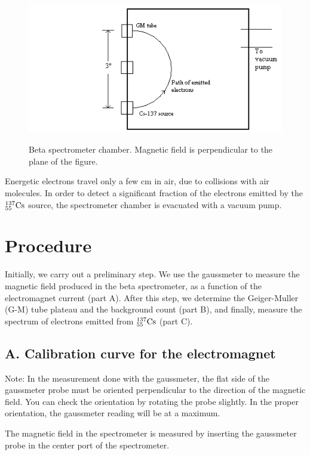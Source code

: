 \documentclass{article}
\newcommand{\cs}{${}^{137}_{55}{\rm Cs}$ }
\begin{document}
\begin{figure}
\begin{centering}
\includegraphics[width=4.9992in,height=2.528in]{images/beta-img5.png} 
\caption{Beta spectrometer chamber.  Magnetic field is perpendicular to the plane of the figure.}
\label{fig:chamber}
\end{centering}
\end{figure}

Energetic electrons travel only a few cm in air, due to collisions with
air molecules.  In order to detect a significant fraction of the
electrons emitted by the \cs source, the spectrometer chamber is
evacuated with a vacuum pump.

\section{Procedure}

Initially, we carry out a preliminary step.  We use the gaussmeter
to measure the magnetic field produced in the beta spectrometer, as a
function of the electromagnet current (part A).  After this step, we
determine the Geiger-Muller (G-M) tube plateau and the background count
(part B), and finally, measure the spectrum of electrons emitted from
\cs (part C).

\subsection{A. Calibration curve for the electromagnet}

Note: In the measurement done with the gaussmeter, the flat side of the
gaussmeter probe must be oriented perpendicular to the direction of the
magnetic field.  You can check the orientation by rotating the probe
slightly.  In the proper orientation, the gaussmeter reading will be
at a maximum.

The magnetic field in the spectrometer is measured by inserting the
gaussmeter probe in the center port of the spectrometer.
\end{document}
